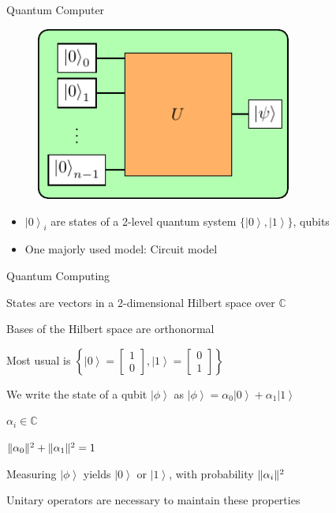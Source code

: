 \documentclass[professionalfonts]{beamer}
\newcommand{\ket}[1]{\ensuremath{\left|#1\right\rangle}}
\DeclarePairedDelimiter\norm{\lVert}{\rVert}
\newcommand{\SubItem}[1]{
    {\setlength\itemindent{15pt} \item[*] #1}
}
\begin{document}
\begin{frame}{Quantum Computer}
\begin{figure}[b]
	\centering
	\includegraphics[width=0.75\textwidth]{img/quantum}
\end{figure}
	\begin{itemize}
		\item $\ket 0_i$ are states of a 2-level quantum system $\{\ket 0, \ket 1\}$, qubits
		\item One majorly used model: Circuit model
	\end{itemize}
\end{frame}



\begin{frame}{Quantum Computing}
	\begin{itemize}
		\item States are vectors in a 2-dimensional Hilbert space over $\mathbb{C}$
		\item Bases of the Hilbert space are orthonormal
			\SubItem {Most usual is 
				$\left\{
					\ket 0 = \begin{bmatrix} 1 \\ 0 \end{bmatrix},
					\ket 1 = \begin{bmatrix} 0 \\ 1 \end{bmatrix}
				\right\}$}
		\item We write the state of a qubit $\ket \phi$ as $\ket \phi = \alpha_0 \ket 0 + \alpha_1 \ket 1$
			\SubItem {$\alpha_i \in \mathbb{C}$}
			\SubItem {$\norm {\alpha_0}^2 + \norm{\alpha_1}^2 = 1 $}
			\SubItem {Measuring $\ket \phi$ yields $\ket 0$ or $\ket 1$, with probability $\norm{\alpha_i}^2$}
			\SubItem {Unitary operators are necessary to maintain these properties}
	\end{itemize}
\end{frame}
\end{document}
